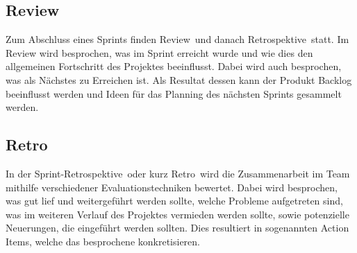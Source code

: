 \subsection{Review}
Zum Abschluss eines Sprints finden \glqq Review\grqq~und danach \glqq Retrospektive\grqq~statt. Im Review wird besprochen, was im Sprint erreicht 
wurde und wie dies den allgemeinen Fortschritt des Projektes beeinflusst. Dabei wird auch besprochen, was als Nächstes zu Erreichen ist. 
Als Resultat dessen kann der Produkt Backlog beeinflusst werden und Ideen für das Planning des nächsten Sprints gesammelt werden. 

\subsection{Retro}
In der \glqq Sprint-Retrospektive\grqq~oder kurz \glqq Retro\grqq~wird die Zusammenarbeit im Team mithilfe verschiedener Evaluationstechniken bewertet. 
Dabei wird besprochen, was gut lief und weitergeführt werden sollte, welche Probleme aufgetreten sind, was im weiteren Verlauf des Projektes 
vermieden werden sollte, sowie potenzielle Neuerungen, die eingeführt werden sollten. Dies resultiert in sogenannten Action Items, welche das 
besprochene konkretisieren.

